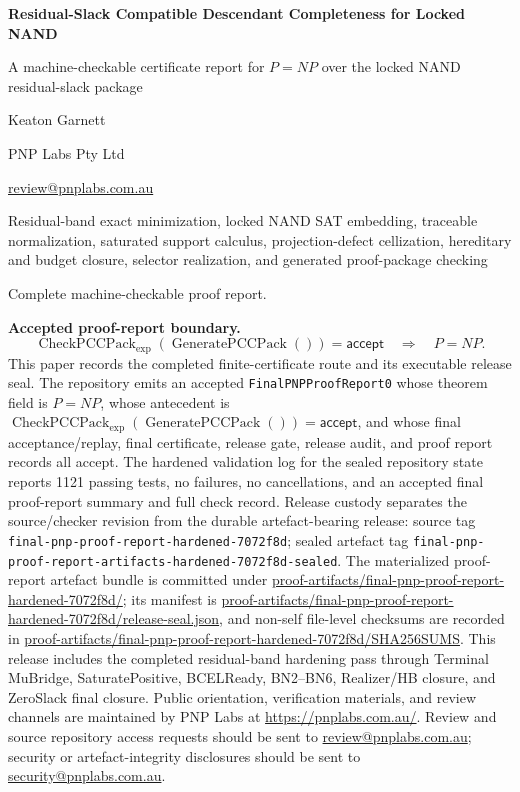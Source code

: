 \documentclass[10.5pt,a4paper]{article}
\newcommand{\CheckPack}{\operatorname{CheckPCCPack}_{\exp}}
\newcommand{\GenPack}{\operatorname{GeneratePCCPack}}
\begin{document}
\begin{titlepage}
\centering
\vspace*{1.0cm}
{\Huge\bfseries Residual-Slack Compatible Descendant Completeness for Locked NAND\par}
\vspace{0.45cm}
{\Large A machine-checkable certificate report for \(P=NP\) over the locked NAND residual-slack package\par}
\vspace{0.45cm}
{\Large Keaton Garnett\par}
\vspace{0.12cm}
{\normalsize PNP Labs Pty Ltd\par}
\vspace{0.12cm}
{\normalsize \href{mailto:review@pnplabs.com.au}{review@pnplabs.com.au}\par}
\vspace{0.55cm}
{\large Residual-band exact minimization, locked NAND SAT embedding, traceable normalization, saturated support calculus, projection-defect cellization, hereditary and budget closure, selector realization, and generated proof-package checking\par}
\vspace{0.85cm}
{\large Complete machine-checkable proof report.\par}
\vfill
\begin{minipage}{0.88\textwidth}
\textbf{Accepted proof-report boundary.}
\[
\CheckPack(\GenPack())=\mathsf{accept}\quad\Longrightarrow\quad P=NP.
\]
This paper records the completed finite-certificate route and its executable release seal.  The repository emits an accepted \texttt{FinalPNPProofReport0} whose theorem field is \(P=NP\), whose antecedent is \(\CheckPack(\GenPack())=\mathsf{accept}\), and whose final acceptance/replay, final certificate, release gate, release audit, and proof report records all accept.  The hardened validation log for the sealed repository state reports 1121 passing tests, no failures, no cancellations, and an accepted final proof-report summary and full check record.  Release custody separates the source/checker revision from the durable artefact-bearing release: source tag \texttt{final-pnp-proof-report-hardened-7072f8d}; sealed artefact tag \texttt{final-pnp-proof-report-artifacts-hardened-7072f8d-sealed}.  The materialized proof-report artefact bundle is committed under \url{proof-artifacts/final-pnp-proof-report-hardened-7072f8d/}; its manifest is \url{proof-artifacts/final-pnp-proof-report-hardened-7072f8d/release-seal.json}, and non-self file-level checksums are recorded in \url{proof-artifacts/final-pnp-proof-report-hardened-7072f8d/SHA256SUMS}.  This release includes the completed residual-band hardening pass through Terminal MuBridge, SaturatePositive, BCELReady, BN2--BN6, Realizer/HB closure, and ZeroSlack final closure. Public orientation, verification materials, and review channels are maintained by PNP Labs at \url{https://pnplabs.com.au/}. Review and source repository access requests should be sent to \href{mailto:review@pnplabs.com.au}{review@pnplabs.com.au}; security or artefact-integrity disclosures should be sent to \href{mailto:security@pnplabs.com.au}{security@pnplabs.com.au}.

\end{minipage}
\end{titlepage}
\end{document}
